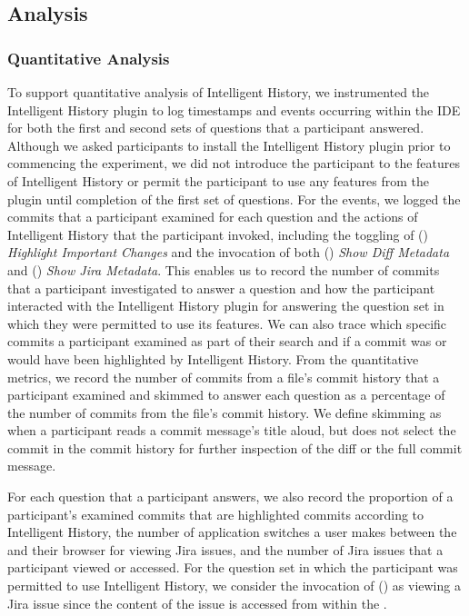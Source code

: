 \subsection{Analysis}

\subsubsection{Quantitative Analysis}

To support quantitative analysis of Intelligent History, 
we instrumented the Intelligent History plugin to log timestamps and events occurring within the IDE
for both the first and second sets of questions that a participant answered.
Although we asked participants to install the Intelligent History plugin prior to commencing the
experiment, we did not introduce the participant to the features of Intelligent History 
or permit the participant to use any features from the plugin until completion of the first set of questions.
For the events, we logged the commits that a participant examined for each question 
and the actions of Intelligent History that the participant invoked,
including the toggling of () \textit{Highlight Important Changes} 
and the invocation of both () \textit{Show Diff Metadata} and () \textit{Show Jira Metadata}.
This enables us to record the number of commits that a participant investigated to answer a question 
and how the participant interacted with the Intelligent History plugin for answering the question set in which they were permitted to use its features.
We can also trace which specific commits a participant examined as part of their search and if a commit was 
or would have been highlighted by Intelligent History.
From the quantitative metrics, we record the number of commits from a file's commit history that a participant examined 
and skimmed to answer each question as a percentage of the number of commits from the file's commit history.
We define skimming as when a participant reads a commit message's title aloud, but does not select the commit in the commit history
for further inspection of the diff or the full commit message.

For each question that a participant answers, we also record the proportion of a participant's examined commits 
that are highlighted commits according to Intelligent History,
the number of application switches a user makes between the  and their browser for viewing Jira issues,
and the number of Jira issues that a participant viewed or accessed.
For the question set in which the participant was permitted to use Intelligent History, 
we consider the invocation of () as viewing a Jira issue since the content of the issue is accessed from within the .

